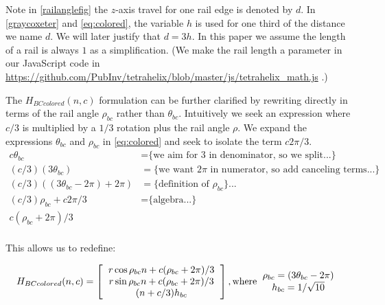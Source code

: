 \documentclass[review]{siamonline1116}
\begin{document}
Note in \cref{railanglefig} the $z$-axis travel for one rail edge is denoted by $d$. In \eqref{graycoxeter} and \eqref{eq:colored}, the variable
$h$ is used for one third of the distance we name $d$. We will later justify that $d = 3h$.
In this paper we assume the length of a rail
is always $1$ as a simplification. (We make the rail length a parameter in our JavaScript code in
\url{https://github.com/PubInv/tetrahelix/blob/master/js/tetrahelix_math.js} \cite{readtetrahelix}.)

The $H_{BCcolored}(n,c)$ formulation can be further clarified by rewriting directly in terms of the rail angle $\rho_{bc}$ rather than $\theta_{bc}$.
Intuitively we seek an expression where $c/3$ is multiplied by a $1/3$ rotation plus the rail angle $\rho$.
We expand 
the expressions $\theta_{bc}$ and $\rho_{bc}$ in \eqref{eq:colored} and seek to isolate the term $c2\pi/3 $.
\begin{align*}
 c \theta_{bc}  &=   \text{\{we aim for 3 in denominator, so we split...\}} \\
    (c/3)  (3 \theta_{bc})  &=   \text{\{we want $2\pi$ in numerator, so add canceling terms...\}} \\
 (c/ 3) ((3 \theta_{bc} - 2 \pi)  + 2 \pi) &= \text{\{definition of $\rho_{bc}$\}...} \\  
  (c / 3) \rho_{bc}  + c 2 \pi /3 &=  \text{\{algebra...\}} \\  
c  ( \rho_{bc} +  2 \pi) /3  \\
\end{align*}

This allows us to redefine:

\begin{equation}
H_{BCcolored}(n,c) =
\left [
  \begin{tabular}{c}
    $ r  \cos{\rho_{bc} n + c (\rho_{bc} +  2 \pi) /3} $\\
   $ r  \sin{\rho_{bc} n + c (\rho_{bc} +  2 \pi) /3} $\\
   $ (n+c/3)  h_{bc} $
  \end{tabular}
  \right ],
\text{where}
  \begin{tabular}{c}
    $\rho_{bc} = (3 \theta_{bc} - 2 \pi)$ \\
    $ h_{bc} = 1/\sqrt{10} $ \\    
  \end{tabular}      
\end{equation}
\end{document}
